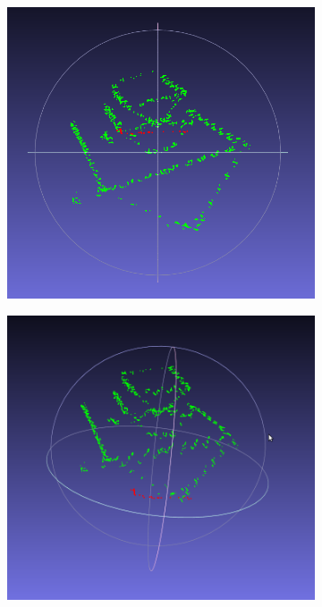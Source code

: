 \begin{figure}[H]
	\centering
	\begin{subfigure}{0.5\textwidth}
	  \centering
	  \includegraphics[width=0.9\linewidth]{figs/SFM1.png}
	\end{subfigure}%
	\begin{subfigure}{0.5\textwidth}
	  \centering
	  \includegraphics[width=0.9\linewidth]{figs/SFM2.png}
	\end{subfigure}
	\begin{subfigure}{0.5\textwidth}

\end{subfigure}
\end{figure}
